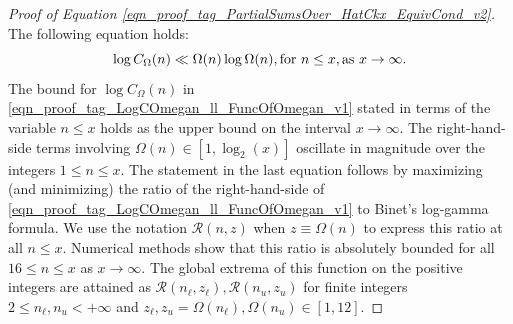 \documentclass[11pt,reqno,a4letter]{article}
\numberwithin{equation}{section}
\numberwithin{figure}{section}
\numberwithin{table}{section}
\theoremstyle{plain}
\numberwithin{theorem}{section}
\theoremstyle{definition}
\theoremstyle{remark}
\newcommand{\mathtext}[1]{\text{\rm #1}}
\begin{document}
\begin{proof}[Proof of Equation \eqref{eqn_proof_tag_PartialSumsOver_HatCkx_EquivCond_v2}]
The following equation holds:
\begin{equation}
\label{eqn_proof_tag_LogCOmegan_ll_FuncOfOmegan_v1}
\log C_{\Omega}(n) \ll \Omega(n) \log \Omega(n), \mathtext{ for } n \leq x, 
     \mathtext{ as } x \rightarrow \infty. 
\end{equation}
The bound for $\log C_{\Omega}(n)$ in 
\eqref{eqn_proof_tag_LogCOmegan_ll_FuncOfOmegan_v1} stated in terms of the variable 
$n \leq x$ holds as the upper bound on the interval $x \rightarrow \infty$. 
The right-hand-side terms involving $\Omega(n) \in [1, \log_2(x)]$ 
oscillate in magnitude over the integers $1 \leq n \leq x$. 
The statement in the last equation follows by 
maximizing (and minimizing) the ratio of the right-hand-side of 
\eqref{eqn_proof_tag_LogCOmegan_ll_FuncOfOmegan_v1} to 
Binet's log-gamma formula. 
We use the notation $\mathcal{R}(n, z)$ when 
$z \equiv \Omega(n)$ to express this ratio at all $n \leq x$. 
Numerical methods show that this ratio is absolutely bounded for all 
$16 \leq n \leq x$ as $x \rightarrow \infty$. 
The global extrema of this function on the positive integers 
are attained as $\mathcal{R}(n_{\ell}, z_{\ell}), \mathcal{R}(n_{u}, z_{u})$ for 
finite integers $2 \leq n_{\ell}, n_u < +\infty$ and 
$z_{\ell},z_u = \Omega(n_{\ell}), \Omega(n_u) \in [1, 12]$. 


\end{proof}
\end{document}
